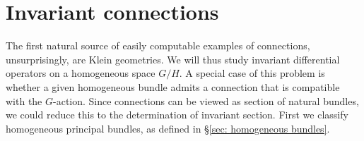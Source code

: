 




\section{Invariant connections}\label{sec: invariant connections}

The first natural source of easily computable examples of connections, unsurprisingly, are Klein geometries. We will thus study invariant differential operators on a homogeneous space $G\slash H$. A special case of this problem is whether a given homogeneous bundle admits a connection that is compatible with the $G$-action. Since connections can be viewed as section of natural bundles, we could reduce this to the determination of invariant section. First we classify homogeneous principal bundles, as defined in \S\ref{sec: homogeneous bundles}.

